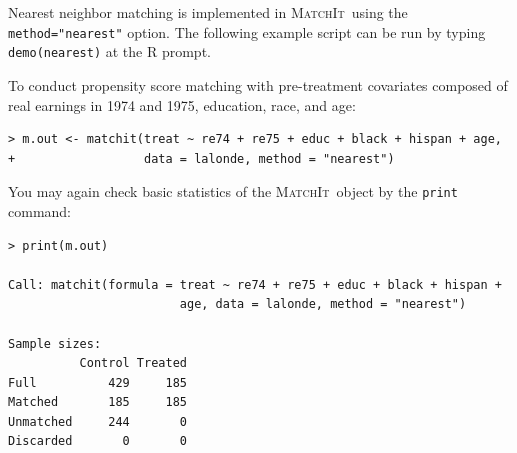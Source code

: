 \documentclass[oneside,letterpaper,titlepage]{article}
\newcommand{\MatchIt}{\textsc{MatchIt}}
\begin{document}
Nearest neighbor matching is implemented in \MatchIt\ using the
\texttt{method="nearest"} option.  The following example script can be
run by typing {\tt demo(nearest)} at the R prompt.

To conduct propensity score matching with pre-treatment covariates
composed of real earnings in 1974 and 1975, education, race, and age:
\begin{verbatim}
> m.out <- matchit(treat ~ re74 + re75 + educ + black + hispan + age,
+                  data = lalonde, method = "nearest")
\end{verbatim}

\noindent You may again check basic statistics of the \MatchIt\ object by the
\texttt{print} command:
\begin{verbatim}
> print(m.out)

Call: matchit(formula = treat ~ re74 + re75 + educ + black + hispan +
                        age, data = lalonde, method = "nearest")

Sample sizes:
          Control Treated
Full          429     185
Matched       185     185
Unmatched     244       0
Discarded       0       0
\end{verbatim}
\end{document}
